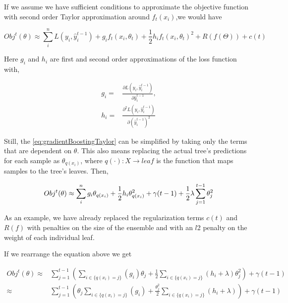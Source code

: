 \begin{appendices}
If we assume we have sufficient conditions to approximate the objective function with second order Taylor approximation around $f_t(x_i)$,we would have

\begin{equation}\label{eq:gradientBoostingTaylor}
Obj^t(\theta) \approx \sum_i^n {L(y_i, \hat{y}^{t-1}_i) + g_i f_t(x_i,\theta_t) + \frac{1}{2} h_i {f_t(x_i,\theta_t)}^2 } + R(f(\Theta)) + c(t)
\end{equation}

Here $g_i$ and $h_i$ are first and second order approximations of the loss function with,

\begin{equation}
\begin{split}
g_i = & \frac{\partial L(y_i, \hat{y}^{t-1}_i)}{\partial \hat{y}^{t-1}_i},  \\
h_i = & \frac{\partial^2 L(y_i, \hat{y}^{t-1}_i)}{\partial {(\hat{y}^{t-1}_i)}^2 }
\end{split}
\end{equation}

Still, the \cref{eq:gradientBoostingTaylor} can be simplified by taking only the terms that are dependent on $\theta$.
This also means replacing the actual tree's predictions for each sample as $\theta_{q(x_i)}$, where $q(\cdot): X \rightarrow leaf$ is the function that maps samples to the tree's leaves. Then,


\begin{equation}\label{eq:gb-objSteps1}
Obj^t(\theta) \approx \sum_i^n {g_i \theta_{q(x_i)} + \frac{1}{2} h_i \theta_{q(x_i)}^2 } + \gamma ({t-1}) + \frac{1}{2}\lambda \sum_{j=1}^{t-1} \theta_j^2 \\
\end{equation}

As an example, we have already replaced the regularization terms $c(t)$ and $R(f)$ with penalties on the size of the ensemble and with an $l$2 penalty on the weight of each individual leaf.

If we rearrange the equation above we get

\begin{equation}\label{eq:gb-objSteps2}
\begin{split}
Obj^t(\theta) \approx & \sum_{j=1}^{t-1} \left( \sum_{i \in \{q(x_i)=j\}} (g_i )\theta_{j} + \frac{1}{2} \sum_{i \in \{q(x_i)=j\}} (h_i + \lambda ) \theta_{j}^2 \right) + \gamma ({t-1}) \\
\approx & \sum_{j=1}^{t-1} \left( \theta_{j}\sum_{i \in \{q(x_i)=j\}} (g_i ) + \frac{\theta_{j}^2}{2} \sum_{i \in \{q(x_i)=j\}} (h_i + \lambda ) \right) + \gamma ({t-1})
\end{split}
\end{equation}


\end{appendices}
